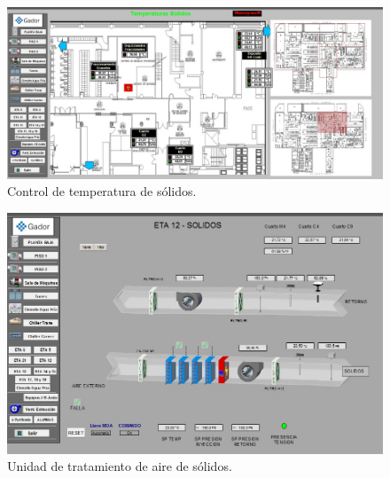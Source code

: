 \begin{figure}[h]
	\centering
	\includegraphics[width=\textwidth]{./Figures/ch2EBI1.jpg}
	\caption{Control de temperatura de sólidos.}
	\label{fig:ch2EBI1}
\end{figure}

\begin{figure}[h]
	\centering
	\includegraphics[width=\textwidth]{./Figures/ch2EBI2.jpg}
	\caption{Unidad de tratamiento de aire de sólidos.}
	\label{fig:ch2EBI2}
\end{figure}
